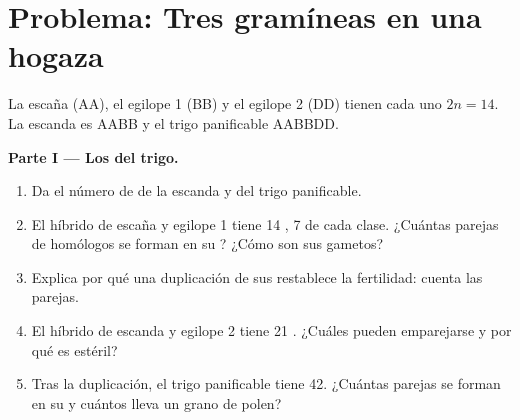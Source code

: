 \section{Problema: Tres gramíneas en una hogaza}

\begin{problem}
\label{pb:g12:diversification-of-life:1}
La escaña (AA), el egilope 1 (BB) y el egilope 2 (DD) tienen cada uno
$2n = 14$. La escanda es AABB y el trigo panificable AABBDD.

\medskip
\noindent\textbf{Parte I --- Los  del trigo.}
\begin{enumerate}
  \item Da el número de  de la escanda y del trigo
        panificable.
  \item El híbrido de escaña y egilope 1 tiene 14 , 7 de cada
        clase. ¿Cuántas parejas de homólogos se forman en su ?
        ¿Cómo son sus gametos?
  \item Explica por qué una duplicación de sus  restablece la
        fertilidad: cuenta las parejas.
  \item El híbrido de escanda y egilope 2 tiene 21 . ¿Cuáles
        pueden emparejarse y por qué es estéril?
  \item Tras la duplicación, el trigo panificable tiene 42. ¿Cuántas
        parejas se forman en su  y cuántos  lleva un
        grano de polen?
\end{enumerate}


\end{problem}
